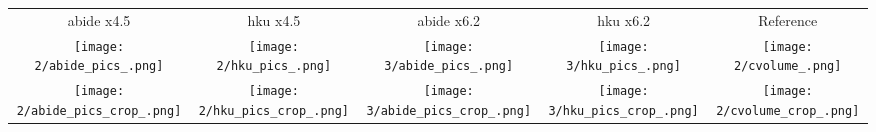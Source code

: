 \begin{tabular}{c @{\hskip 0pt} c @{\hskip 0pt} c @{\hskip 0pt} c @{\hskip 0pt} c}
    abide x4.5 & hku x4.5 & abide x6.2 & hku x6.2 & Reference\\
    \texttt{[image: 2/abide\_pics\_.png]}&
    \texttt{[image: 2/hku\_pics\_.png]}&
    \texttt{[image: 3/abide\_pics\_.png]}&
    \texttt{[image: 3/hku\_pics\_.png]}&
    \texttt{[image: 2/cvolume\_.png]}\\
    \texttt{[image: 2/abide\_pics\_crop\_.png]}&
    \texttt{[image: 2/hku\_pics\_crop\_.png]}&
    \texttt{[image: 3/abide\_pics\_crop\_.png]}&
    \texttt{[image: 3/hku\_pics\_crop\_.png]}&
    \texttt{[image: 2/cvolume\_crop\_.png]}
\end{tabular}